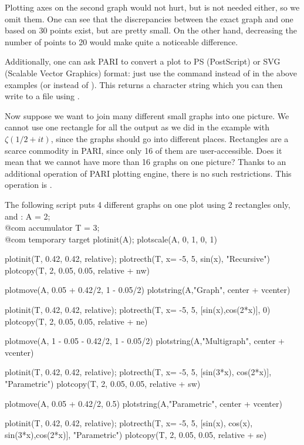 \noindent Plotting axes on the second graph would not hurt, but
is not needed either, so we omit them.  One can see that the discrepancies
between the exact graph and one based on 30 points exist, but are pretty
small.  On the other hand, decreasing the number of points to 20 would make
quite a noticeable difference.

Additionally, one can ask PARI to convert a plot to PS (PostScript)
or SVG (Scalable Vector Graphics) format: just use the command
 instead of  in the above examples (or
 instead of ). This returns a character string
which you can then write to a file using .

Now suppose we want to join many different small graphs into one picture.
We cannot use one rectangle for all the output as we did in the example
with $\zeta({1/2}+it)$, since the graphs should go into different places.
Rectangles are a scarce commodity in PARI, since only 16 of them are
user-accessible.  Does it mean that we cannot have more than 16 graphs on
one picture?  Thanks to an additional operation of PARI plotting engine,
there is no such restrictions.  This operation is .

The following script puts 4 different graphs on one plot using 2 rectangles
only,  and :
\bprog
  A = 2;   \\@com accumulator
  T = 3;   \\@com temporary target
  plotinit(A);         plotscale(A, 0, 1, 0, 1)

  plotinit(T, 0.42, 0.42, relative);
  plotrecth(T, x= -5, 5, sin(x), "Recursive")
  plotcopy(T, 2, 0.05, 0.05, relative + nw)

  plotmove(A, 0.05 + 0.42/2, 1 - 0.05/2)
  plotstring(A,"Graph", center + vcenter)

  plotinit(T, 0.42, 0.42, relative);
  plotrecth(T, x= -5, 5, [sin(x),cos(2*x)], 0)
  plotcopy(T, 2, 0.05, 0.05, relative + ne)

  plotmove(A, 1 - 0.05 - 0.42/2, 1 - 0.05/2)
  plotstring(A,"Multigraph", center + vcenter)

  plotinit(T, 0.42, 0.42, relative);
  plotrecth(T, x= -5, 5, [sin(3*x), cos(2*x)], "Parametric")
  plotcopy(T, 2, 0.05, 0.05, relative + sw)

  plotmove(A, 0.05 + 0.42/2, 0.5)
  plotstring(A,"Parametric", center + vcenter)

  plotinit(T, 0.42, 0.42, relative);
  plotrecth(T, x= -5, 5, [sin(x), cos(x), sin(3*x),cos(2*x)], "Parametric")
  plotcopy(T, 2, 0.05, 0.05, relative + se)

